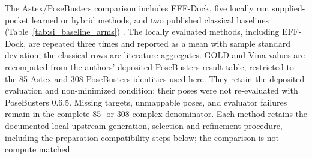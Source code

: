 \documentclass{article}
\newcommand{\citep}[1]{\cite{#1}}
\begin{document}
The Astex/PoseBusters comparison includes EFF-Dock, five locally run supplied-pocket learned or hybrid methods, and two published classical baselines (Table~\ref{tab:si_baseline_arms}) \citep{prat2025sigmadock,plainer2023diffdockpocket,broster2026rldiff,zhu2024diffbindfr,cao2025surfdock,trott2010vina,eberhardt2021vina,mcnutt2025gnina,buttenschoen2024posebusters}.
The locally evaluated methods, including EFF-Dock, are repeated three times and reported as a mean with sample standard deviation; the classical rows are literature aggregates. GOLD and Vina values are recomputed from the authors' deposited \href{https://zenodo.org/records/8278563}{PoseBusters result table}, restricted to the 85 Astex and 308 PoseBusters identities used here. They retain the deposited evaluation and non-minimized condition; their poses were not re-evaluated with PoseBusters 0.6.5.
Missing targets, unmappable poses, and evaluator failures remain in the complete 85- or 308-complex denominator.
Each method retains the documented local upstream generation, selection and refinement procedure, including the preparation compatibility steps below; the comparison is not compute matched.
\end{document}
